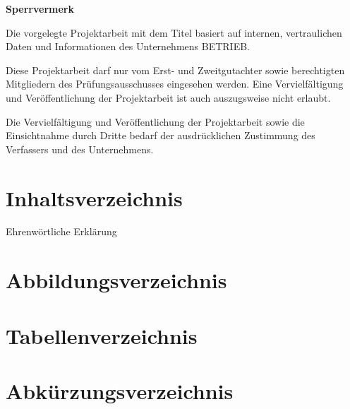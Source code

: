 \documentclass[a4paper, 11pt]{article}
\begin{document}
\begin{center}
  \vspace*{5.5cm}
  {\LARGE\bf Sperrvermerk}
  \vspace*{1cm}
\end{center}

Die vorgelegte Projektarbeit mit dem Titel \inserttitle basiert auf internen, vertraulichen Daten und Informationen des Unternehmens BETRIEB.

Diese Projektarbeit darf nur vom Erst- und Zweitgutachter sowie berechtigten Mitgliedern des Prüfungsausschusses eingesehen werden.
Eine Vervielfältigung und Veröffentlichung der Projektarbeit ist auch auszugsweise nicht erlaubt.

Die Vervielfältigung und Veröffentlichung der Projektarbeit sowie die Einsichtnahme durch Dritte bedarf der ausdrücklichen
Zustimmung des Verfassers und des Unternehmens.
\newpage



\section*{Inhaltsverzeichnis}
\pagestyle{sxoli1}
\renewcommand\contentsname{}
\tableofcontents
Ehrenwörtliche Erklärung
\newpage

\section*{Abbildungsverzeichnis}
\renewcommand\listfigurename{}
\setlength{\cftfigindent}{0em}
\setlength{\cftfignumwidth}{6.5em}
\renewcommand{\cftfigpresnum}{Abbildung }
\listoffigures
\newpage

\section*{Tabellenverzeichnis}
\renewcommand\listtablename{}
\setlength{\cfttabindent}{0em}
\setlength{\cfttabnumwidth}{5.5em}
\renewcommand{\cfttabpresnum}{Tabelle }
\listoftables
\newpage

\section*{Abkürzungsverzeichnis}
\begin{acronym}[**********]
 \end{acronym}
\newpage
\end{document}
